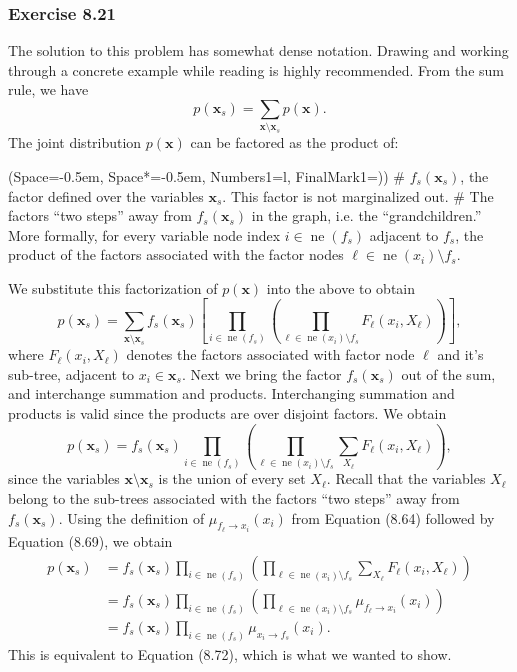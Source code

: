 \documentclass[12pt, a4paper]{article}
\newcommand{\listSpace}{-0.5em}%
\newcommand{\vect}[1]{\bm{#1}}
\begin{document}
\subsubsection*{Exercise 8.21}
The solution to this problem has somewhat dense notation.
Drawing and working through a concrete example while reading is highly recommended.
From the sum rule, we have
\begin{equation*}
	p(\vect{x}_s) = \sum_{ \vect{x} \setminus \vect{x}_s } p(\vect{x}).
\end{equation*}
The joint distribution $p(\vect{x})$ can be factored as the product of:
\begin{easylist}[itemize]
	\ListProperties(Space=\listSpace, Space*=\listSpace, Numbers1=l, FinalMark1={)})
	#  $f_s(\vect{x}_s)$, the factor defined over the variables $\vect{x}_s$.
	This factor is not marginalized out.
	# The factors ``two steps'' away from $f_s(\vect{x}_s)$ in the graph, i.e. the ``grandchildren.''
	More formally, for every variable node index $i \in \operatorname{ne}(f_s)$ adjacent to $f_s$, the product of the factors associated with the factor nodes $\ell \in \operatorname{ne}(x_i) \setminus f_s$.
\end{easylist}
We substitute this factorization of $p(\vect{x})$ into the above to obtain
\begin{equation*}
p(\vect{x}_s) = \sum_{ \vect{x} \setminus \vect{x}_s }
f_s(\vect{x}_s)
\left[ 
\prod_{i \in \operatorname{ne}(f_s)}
\left( 
\prod_{\ell \in \operatorname{ne}(x_i) \setminus f_s}
 F_\ell (x_i, X_\ell)
 \right)
 \right],
\end{equation*}
where $F_\ell (x_i, X_\ell)$ denotes the factors associated with factor node $\ell$ and it's sub-tree, adjacent to $x_i \in \vect{x}_s$.
Next we bring the factor $f_s(\vect{x}_s)$ out of the sum, and interchange summation and products.
Interchanging summation and products is valid since the products are over disjoint factors. 
We obtain
\begin{equation*}
p(\vect{x}_s) = f_s(\vect{x}_s) 
\prod_{i \in \operatorname{ne}(f_s)}
\left( 
\prod_{\ell \in \operatorname{ne}(x_i) \setminus f_s}
\sum_{ X_\ell }
F_\ell (x_i, X_\ell)
\right),
\end{equation*}
since the variables $\vect{x} \setminus \vect{x}_s$ is the union of every set $X_\ell$. 
Recall that the variables $X_\ell$ belong to the sub-trees associated with the factors ``two steps'' away from $f_s(\vect{x}_s)$.
Using the definition of $\mu_{f_\ell \to x_i}(x_i)$ from Equation (8.64) followed by Equation (8.69), we obtain
\begin{align*}
	p(\vect{x}_s) &= f_s(\vect{x}_s) 
	\prod_{i \in \operatorname{ne}(f_s)}
	\left( 
	\prod_{\ell \in \operatorname{ne}(x_i) \setminus f_s}
	\sum_{ X_\ell }
	F_\ell (x_i, X_\ell)
	\right) \\
	&= f_s(\vect{x}_s) 
	\prod_{i \in \operatorname{ne}(f_s)}
	\left( 
	\prod_{\ell \in \operatorname{ne}(x_i) \setminus f_s}
	\mu_{f_\ell \to x_i}(x_i)
	\right) \\
	&=
	f_s(\vect{x}_s) 
	\prod_{i \in \operatorname{ne}(f_s)}
	\mu_{x_i \to f_s}(x_i).
\end{align*}
This is equivalent to Equation (8.72), which is what we wanted to show.
\end{document}
